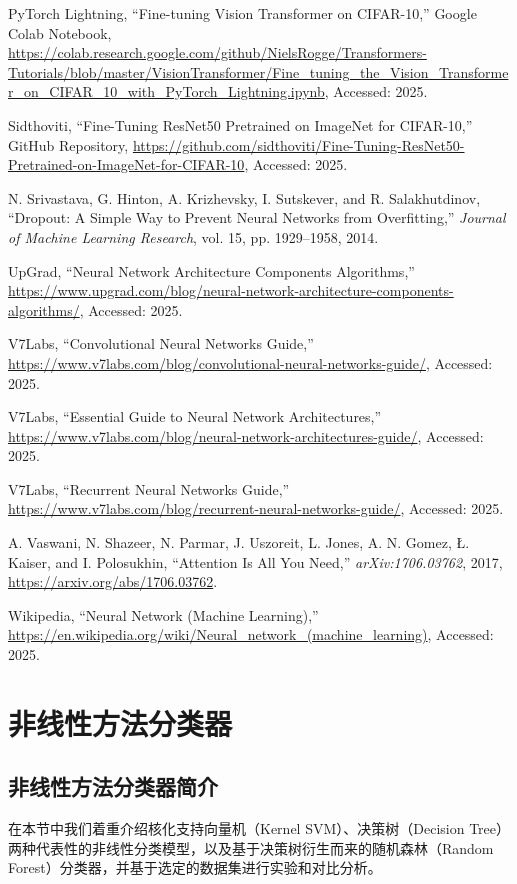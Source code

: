 \documentclass[UTF8]{report}
\theoremstyle{MyLineTheoremStyle} %
\theoremstyle{MyBlockTheoremStyle} %
\theoremstyle{MySubsubsectionStyle} %
\begin{document}
\begin{thebibliography}{9}
PyTorch Lightning, ``Fine-tuning Vision Transformer on CIFAR-10,'' Google Colab Notebook, \url{https://colab.research.google.com/github/NielsRogge/Transformers-Tutorials/blob/master/VisionTransformer/Fine_tuning_the_Vision_Transformer_on_CIFAR_10_with_PyTorch_Lightning.ipynb}, Accessed: 2025.

Sidthoviti, ``Fine-Tuning ResNet50 Pretrained on ImageNet for CIFAR-10,'' GitHub Repository, \url{https://github.com/sidthoviti/Fine-Tuning-ResNet50-Pretrained-on-ImageNet-for-CIFAR-10}, Accessed: 2025.

N. Srivastava, G. Hinton, A. Krizhevsky, I. Sutskever, and R. Salakhutdinov, ``Dropout: A Simple Way to Prevent Neural Networks from Overfitting,'' \textit{Journal of Machine Learning Research}, vol. 15, pp. 1929--1958, 2014.

UpGrad, ``Neural Network Architecture Components Algorithms,'' \url{https://www.upgrad.com/blog/neural-network-architecture-components-algorithms/}, Accessed: 2025.

V7Labs, ``Convolutional Neural Networks Guide,'' \url{https://www.v7labs.com/blog/convolutional-neural-networks-guide/}, Accessed: 2025.

V7Labs, ``Essential Guide to Neural Network Architectures,'' \url{https://www.v7labs.com/blog/neural-network-architectures-guide/}, Accessed: 2025.

V7Labs, ``Recurrent Neural Networks Guide,'' \url{https://www.v7labs.com/blog/recurrent-neural-networks-guide/}, Accessed: 2025.

A. Vaswani, N. Shazeer, N. Parmar, J. Uszoreit, L. Jones, A. N. Gomez, Ł. Kaiser, and I. Polosukhin, ``Attention Is All You Need,'' \textit{arXiv:1706.03762}, 2017, \url{https://arxiv.org/abs/1706.03762}.

Wikipedia, ``Neural Network (Machine Learning),'' \url{https://en.wikipedia.org/wiki/Neural_network_(machine_learning)}, Accessed: 2025.

\end{thebibliography}

\chapter{非线性方法分类器}
\section{非线性方法分类器简介}
在本节中我们着重介绍核化支持向量机（Kernel SVM）、决策树（Decision Tree）两种代表性的非线性分类模型，以及基于决策树衍生而来的随机森林（Random Forest）分类器，并基于选定的数据集进行实验和对比分析。
\end{document}
